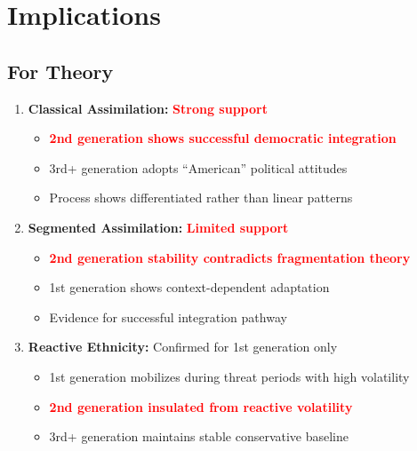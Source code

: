 
\section{Implications}

\subsection{For Theory}
\begin{enumerate}
    \item \textbf{Classical Assimilation:} \textcolor{red}{\textbf{Strong support}}
        \begin{itemize}
            \item \textcolor{red}{\textbf{2nd generation shows successful democratic integration}}
            \item 3rd+ generation adopts ``American'' political attitudes
            \item Process shows differentiated rather than linear patterns
        \end{itemize}
    
    \item \textbf{Segmented Assimilation:} \textcolor{red}{\textbf{Limited support}}
        \begin{itemize}
            \item \textcolor{red}{\textbf{2nd generation stability contradicts fragmentation theory}}
            \item 1st generation shows context-dependent adaptation
            \item Evidence for successful integration pathway
        \end{itemize}
    
    \item \textbf{Reactive Ethnicity:} Confirmed for 1st generation only
        \begin{itemize}
            \item 1st generation mobilizes during threat periods with high volatility
            \item \textcolor{red}{\textbf{2nd generation insulated from reactive volatility}}
            \item 3rd+ generation maintains stable conservative baseline
        \end{itemize}
\end{enumerate}

